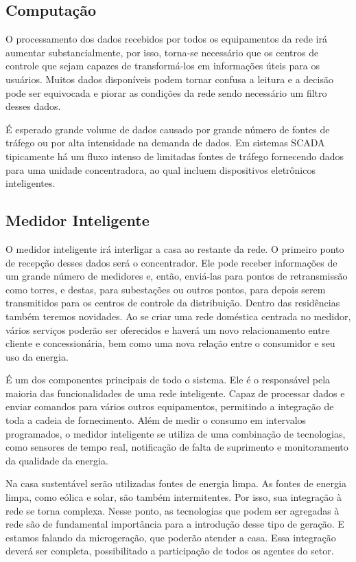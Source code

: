 \subsection{Computação}

	O processamento dos dados recebidos por todos os equipamentos da rede irá aumentar substancialmente, por isso, torna-se necessário que os centros de controle que sejam capazes de transformá-los em informações úteis para os usuários. Muitos dados disponíveis podem tornar confusa a leitura e a decisão pode ser equivocada e piorar as condições da rede sendo necessário um filtro desses dados.

	É esperado grande volume de dados causado por grande número de fontes de tráfego ou por alta intensidade na demanda de dados. Em sistemas SCADA tipicamente há um fluxo intenso de limitadas fontes de tráfego fornecendo dados para uma unidade concentradora, ao qual incluem dispositivos eletrônicos inteligentes.

\subsection{Medidor Inteligente}

	O medidor inteligente irá interligar a casa ao restante da rede. O primeiro ponto de recepção desses dados será o concentrador. Ele pode receber informações de um grande número de medidores e, então, enviá-las para pontos de retransmissão como torres, e destas, para subestações ou outros pontos, para depois serem transmitidos para os centros de controle da distribuição. Dentro das residências também teremos novidades. Ao se criar uma rede doméstica centrada no medidor, vários serviços poderão ser oferecidos e haverá um novo relacionamento entre cliente e concessionária, bem como uma nova relação entre o consumidor e seu uso da energia.

	É um dos componentes principais de todo o sistema. Ele é o responsável pela maioria das funcionalidades de uma rede inteligente. Capaz de processar dados e enviar comandos para vários outros equipamentos, permitindo a integração de toda a cadeia de fornecimento. Além de medir o consumo em intervalos programados, o medidor inteligente se utiliza de uma combinação de tecnologias, como sensores de tempo real, notificação de falta de suprimento e monitoramento da qualidade da energia.

	Na casa sustentável serão utilizadas fontes de energia limpa. As fontes de energia limpa, como eólica e solar, são também intermitentes. Por isso, sua integração à rede se torna complexa. Nesse ponto, as tecnologias que podem ser agregadas à rede são de fundamental importância para a introdução desse tipo de geração. E estamos falando da microgeração, que poderão atender a casa. Essa integração deverá ser completa, possibilitado a participação de todos os agentes do setor.

